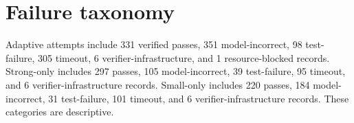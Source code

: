 \documentclass[10pt]{article}
\begin{document}
\section{Failure taxonomy}
Adaptive attempts include 331 verified passes, 351 model-incorrect, 98
test-failure, 305 timeout, 6 verifier-infrastructure, and 1 resource-blocked
records. Strong-only includes 297 passes, 105 model-incorrect, 39 test-failure,
95 timeout, and 6 verifier-infrastructure records. Small-only includes 220
passes, 184 model-incorrect, 31 test-failure, 101 timeout, and 6
verifier-infrastructure records. These categories are descriptive.
\end{document}
